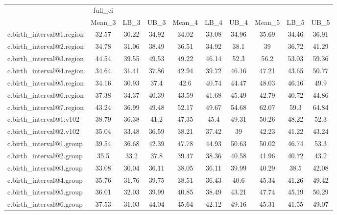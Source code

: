 \begin{tabular}{l*{9}{c}}
\hline\hline
                    &     full\_ci&            &            &            &            &            &            &            &            \\
                    &      Mean\_3&        LB\_3&        UB\_3&      Mean\_4&        LB\_4&        UB\_4&      Mean\_5&        LB\_5&        UB\_5\\
\hline
c.birth\_interval@1.region&       32.57&       30.22&       34.92&       34.02&       33.08&       34.96&       35.69&       34.46&       36.91\\
c.birth\_interval@2.region&       34.78&       31.06&       38.49&       36.51&       34.92&        38.1&          39&       36.72&       41.29\\
c.birth\_interval@3.region&       44.54&       39.55&       49.53&       49.22&       46.14&        52.3&        56.2&       53.03&       59.36\\
c.birth\_interval@4.region&       34.64&       31.41&       37.86&       42.94&       39.72&       46.16&       47.21&       43.65&       50.77\\
c.birth\_interval@5.region&       34.16&       30.93&        37.4&        42.6&       40.74&       44.47&       48.03&       46.16&        49.9\\
c.birth\_interval@6.region&       37.38&       34.37&       40.39&       43.59&       41.68&       45.49&       42.79&       40.72&       44.86\\
c.birth\_interval@7.region&       43.24&       36.99&       49.48&       52.17&       49.67&       54.68&       62.07&        59.3&       64.84\\
c.birth\_interval@1.v102&       38.79&       36.38&        41.2&       47.35&        45.4&       49.31&       50.26&       48.22&        52.3\\
c.birth\_interval@2.v102&       35.04&       33.48&       36.59&       38.21&       37.42&          39&       42.23&       41.22&       43.24\\
c.birth\_interval@1.group&       39.54&       36.68&       42.39&       47.78&       44.93&       50.63&       50.02&       46.74&        53.3\\
c.birth\_interval@2.group&        35.5&        33.2&        37.8&       39.47&       38.36&       40.58&       41.96&       40.72&        43.2\\
c.birth\_interval@3.group&       33.08&       30.04&       36.11&       38.05&       36.11&       39.99&       40.29&        38.5&       42.08\\
c.birth\_interval@4.group&       35.76&       31.76&       39.75&       38.51&       36.43&        40.6&       45.34&       41.26&       49.42\\
c.birth\_interval@5.group&       36.01&       32.03&       39.99&       40.85&       38.49&       43.21&       47.74&       45.19&       50.29\\
c.birth\_interval@6.group&       37.53&       31.03&       44.04&       45.64&       42.12&       49.16&       45.31&       41.55&       49.07\\
\hline\hline
\end{tabular}
